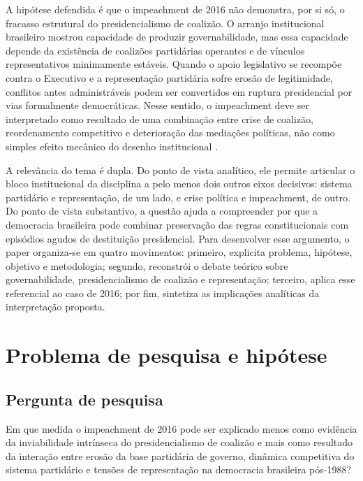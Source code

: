 \documentclass[12pt,a4paper]{article}
\begin{document}
A hipótese defendida é que o impeachment de 2016 não demonstra, por si só, o fracasso estrutural do presidencialismo de coalizão. O arranjo institucional brasileiro mostrou capacidade de produzir governabilidade, mas essa capacidade depende da existência de coalizões partidárias operantes e de vínculos representativos minimamente estáveis. Quando o apoio legislativo se recompõe contra o Executivo e a representação partidária sofre erosão de legitimidade, conflitos antes administráveis podem ser convertidos em ruptura presidencial por vias formalmente democráticas. Nesse sentido, o impeachment deve ser interpretado como resultado de uma combinação entre crise de coalizão, reordenamento competitivo e deterioração das mediações políticas, não como simples efeito mecânico do desenho institucional \textcite{limongi2017_a_crise} \textcite{perez_lian2016_explaining_military}.

A relevância do tema é dupla. Do ponto de vista analítico, ele permite articular o bloco institucional da disciplina a pelo menos dois outros eixos decisivos: sistema partidário e representação, de um lado, e crise política e impeachment, de outro. Do ponto de vista substantivo, a questão ajuda a compreender por que a democracia brasileira pode combinar preservação das regras constitucionais com episódios agudos de destituição presidencial. Para desenvolver esse argumento, o paper organiza-se em quatro movimentos: primeiro, explicita problema, hipótese, objetivo e metodologia; segundo, reconstrói o debate teórico sobre governabilidade, presidencialismo de coalizão e representação; terceiro, aplica esse referencial ao caso de 2016; por fim, sintetiza as implicações analíticas da interpretação proposta.

\section{Problema de pesquisa e hipótese}
\label{sec:org7958d02}
\subsection{Pergunta de pesquisa}
\label{sec:org59f509b}
Em que medida o impeachment de 2016 pode ser explicado menos como evidência da inviabilidade intrínseca do presidencialismo de coalizão e mais como resultado da interação entre erosão da base partidária de governo, dinâmica competitiva do sistema partidário e tensões de representação na democracia brasileira pós-1988?
\end{document}
